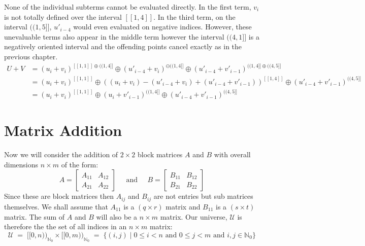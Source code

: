 None of the individual subterms cannot be evaluated directly.
In the first term, $v_i$ is not totally defined over the interval $[\![1,4]\!]$.
In the third term, on the interval $(\!(1,5]\!]$, $u'_{i-4}$ would even evaluated on negative indices.
However, these unevaluable terms also appear in the middle term however the interval $(\!(4,1]\!]$ is a negatively oriented
 interval and the offending points cancel exactly as in the previous chapter.
\begin{align*}
	U + V
		&= (u_i + v_i)^{[\![1,1]\!] \oplus (\!(1,4]\!]} 
			\oplus (u'_{i-4} + v_i)^{\ominus(\!(1,4]\!]} 
			\oplus (u'_{i-4} + v'_{i-1})^{(\!(1,4]\!] \oplus (\!(4,5]\!]}\\
		&= (u_i + v_i)^{[\![1,1]\!]} 
			\oplus \left((u_i + v_i) - (u'_{i-4} + v_i) + (u'_{i-4} + v'_{i-1})\right)^{[\![1,4]\!]} 
			\oplus (u'_{i-4} + v'_{i-1})^{(\!(4,5]\!]} \\ 
		&= (u_i + v_i)^{[\![1,1]\!]} 
			\oplus (u_i + v'_{i-1})^{(\!(1,4]\!]} 
			\oplus (u'_{i-4} + v'_{i-1})^{(\!(4,5]\!]}
\end{align*}

\section{Matrix Addition}


Now we will consider the addition of $2 \times 2$ block matrices $A$ and $B$ with overall dimensions $n \times m$ 
of the form:
\begin{equation*}
	A = \left[ \begin{array}{cc} A_{11} & A_{12} \\ A_{21} & A_{22} \end{array} \right]
	\;\;\;\;\; \text{and} \;\;\;\;\;
	B = \left[ \begin{array}{cc} B_{11} & B_{12} \\ B_{21} & B_{22} \end{array} \right]
\end{equation*}
Since these are block matrices then $A_{ij}$ and $B_{ij}$ are not entries but sub matrices themselves.
We shall assume that $A_{11}$ is a $(q \times r)$ matrix and $B_{11}$ is a $(s \times t)$ matrix.
The sum of $A$ and $B$ will also be a $n \times m$ matrix.
Our universe, $\mathcal{U}$ is therefore the the set of all indices in an $n \times m$ matrix:
\begin{equation*}
	\mathcal{U} 
		\;=\; [\![0,n)\!)_{\mathbb{N}_0} \times [\![0,m)\!)_{\mathbb{N}_0} 
		\;=\; \{ (i,j) \;|\; 0 \leq i < n \text{ and } 0 \leq j < m \text{ and } i,j \in \mathbb{N}_0 \} 
\end{equation*}


